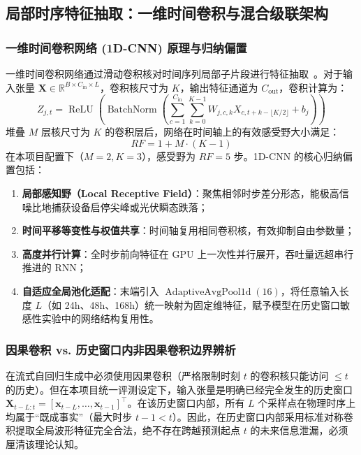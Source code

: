 \subsection{局部时序特征抽取：一维时间卷积与混合级联架构}
\label{subsec:cnn_zh}

\subsubsection{一维时间卷积网络 (1D-CNN) 原理与归纳偏置}
一维时间卷积网络通过滑动卷积核对时间序列局部子片段进行特征抽取~\cite{bai2018empirical}。对于输入张量 $\mathbf{X} \in \mathbb{R}^{B \times C_{\text{in}} \times L}$，卷积核尺寸为 $K$，输出特征通道为 $C_{\text{out}}$，卷积计算为：
\begin{equation}
    Z_{j, t} = \operatorname{ReLU}\left( \operatorname{BatchNorm}\left( \sum_{c=1}^{C_{\text{in}}} \sum_{k=0}^{K-1} W_{j, c, k} X_{c, t + k - \lfloor K/2 \rfloor} + b_j \right) \right)
\end{equation}
堆叠 $M$ 层核尺寸为 $K$ 的卷积层后，网络在时间轴上的有效感受野大小满足：
\begin{equation}
    RF = 1 + M \cdot (K - 1)
\end{equation}
在本项目配置下（$M=2, K=3$），感受野为 $RF = 5$ 步。1D-CNN 的核心归纳偏置包括：
\begin{enumerate}
    \item \textbf{局部感知野（Local Receptive Field）}：聚焦相邻时步差分形态，能极高信噪比地捕获设备启停尖峰或光伏瞬态跌落；
    \item \textbf{时间平移等变性与权值共享}：时间轴复用相同卷积核，有效抑制自由参数量；
    \item \textbf{高度并行计算}：全时步前向特征在 GPU 上一次性并行展开，吞吐量远超串行推进的 RNN；
    \item \textbf{自适应全局池化适配}：末端引入 $\operatorname{AdaptiveAvgPool1d}(16)$，将任意输入长度 $L$（如 24h、48h、168h）统一映射为固定维特征，赋予模型在历史窗口敏感性实验中的网络结构复用性。
\end{enumerate}

\subsubsection{因果卷积 vs. 历史窗口内非因果卷积边界辨析}
在流式自回归生成中必须使用因果卷积（严格限制时刻 $t$ 的卷积核只能访问 $\le t$ 的历史）。但在本项目统一评测设定下，输入张量是明确已经完全发生的历史窗口 $\mathbf{X}_{t-L:t} = [\mathbf{x}_{t-L}, \dots, \mathbf{x}_{t-1}]^\top$。在该历史窗口内部，所有 $L$ 个采样点在物理时序上均属于“既成事实”（最大时步 $t-1 < t$）。因此，在历史窗口内部采用标准对称卷积提取全局波形特征完全合法，绝不存在跨越预测起点 $t$ 的未来信息泄漏，必须厘清该理论认知。

